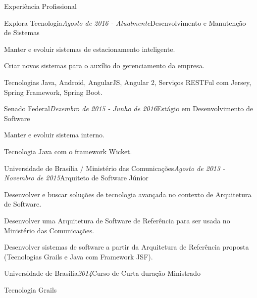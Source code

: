 \documentclass{resume} %
\begin{document}
\begin{rSection}{Experiência Profissional}

\begin{rSubsection}{Explora Tecnologia}{\em Agosto de 2016 - Atualmente}{Desenvolvimento e Manutenção de Sistemas}{}
\item Manter e evoluir sistemas de estacionamento inteligente.
\item Criar novos sistemas para o auxílio do gerenciamento da empresa.
\item Tecnologias Java, Android, AngularJS, Angular 2, Serviços RESTFul com Jersey, Spring Framework, Spring Boot.
\end{rSubsection}

\begin{rSubsection}{Senado Federal}{\em Dezembro de 2015 - Junho de 2016}{Estágio em Desenvolvimento de Software}{}
\item Manter e evoluir sistema interno.
\item Tecnologia Java com o framework Wicket.
\end{rSubsection}

\begin{rSubsection}{Universidade de Brasília / Ministério das Comunicações}{\em Agosto de 2013 - Novembro de 2015}{Arquiteto de Software Júnior}{}
\item Desenvolver e buscar soluções de tecnologia avançada no contexto de Arquitetura de
Software.
\item Desenvolver uma Arquitetura de Software de Referência para ser usada no Ministério
das Comunicações.
\item Desenvolver sistemas de software a partir da Arquitetura de Referência proposta (Tecnologias Grails e Java com Framework JSF).
\end{rSubsection}


\begin{rSubsection}{Universidade de Brasília}{\em 2014}{Curso de Curta duração Ministrado}{}
\item Tecnologia Grails
\end{rSubsection}

\end{rSection}

\end{document}
